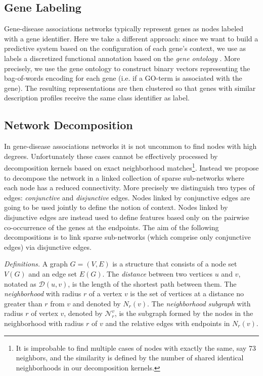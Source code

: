 \documentclass{esannV2}
\begin{document}
\subsection{Gene Labeling} Gene-disease associations networks typically
represent genes as nodes labeled with a gene identifier. Here we take a
different approach: since we want to build a predictive system based on the
configuration of each gene's context, we use as labels a discretized
functional annotation based on the \textit{gene ontology} \cite{ontology}.
More precisely,  we use the gene ontology to construct binary vectors
representing the bag-of-words encoding for each gene (i.e. if a GO-term is
associated with the gene). The resulting representations are then clustered so
that genes with similar description profiles receive the same class identifier
as label.



\subsection{Network Decomposition} 

In gene-disease associations networks it is not uncommon to find nodes with
high degrees. Unfortunately these cases cannot be effectively processed by
decomposition kernels based on exact neighborhood matches\footnote{It is
improbable to find multiple cases of nodes with exactly the same, say 73
neighbors, and the similarity is defined by the number of shared identical
neighborhoods in our decomposition kernels.}. Instead we propose to decompose
the network in a linked collection of sparse sub-networks where each node has
a reduced connectivity. More precisely we distinguish two types of edges: {\em
conjunctive} and {\em disjunctive} edges. Nodes linked by conjunctive edges
are going to be used jointly to define the notion of context. Nodes linked by
disjunctive edges are instead used to define features based only on the
pairwise co-occurrence of the genes at the endpoints. The aim of the following
decompositions is to link sparse sub-networks (which comprise only conjunctive
edges) via disjunctive edges. 

\textit{Definitions.} A graph $G = (V,E)$ is a structure that
consists of a node set $V(G)$ and an edge set $E(G)$. The
\textit{distance} between two vertices $u$ and $v$, notated as
$\mathcal{D}(u,v)$, is the length of the shortest path between them. The
\textit{neighborhood} with radius $r$ of a vertex $v$ is the set of vertices
at a distance no greater than $r$ from $v$ and denoted by $N_r(v)$. 
The \textit{neighborhood subgraph} with radius $r$ of vertex $v$, denoted by
$\mathcal{N}_{r}^{v}$,  is the subgraph formed by the nodes in the
neighborhood with radius $r$ of $v$ and the relative edges with endpoints in
$N_r(v)$.
\end{document}
